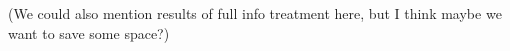 \documentclass[12pt]{article}
\begin{document}
(We could also mention results of full info treatment here, but I think maybe we want to save some space?)
\\

\end{document}
